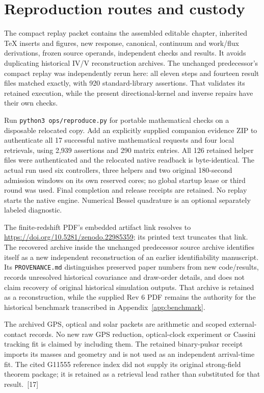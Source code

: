 \documentclass[10pt,twocolumn,letterpaper]{article}
\begin{document}
\section{Reproduction routes and custody}\label{app:reproduce}
The compact replay packet contains the assembled editable chapter, inherited TeX inserts and figures, new response, canonical, continuum and work/flux derivations, frozen source operands, independent checks and results. It avoids duplicating historical IV/V reconstruction archives. The unchanged predecessor's compact replay was independently rerun here: all eleven steps and fourteen result files matched exactly, with 920 standard-library assertions. That validates its retained execution, while the present directional-kernel and inverse repairs have their own checks.

Run \texttt{python3 ops/reproduce.py} for portable mathematical checks on a disposable relocated copy. Add an explicitly supplied companion evidence ZIP to authenticate all 17 successful native mathematical requests and four local retrievals, using 2,939 assertions and 290 matrix entries. All 126 retained helper files were authenticated and the relocated native readback is byte-identical. The actual run used six controllers, three helpers and two original 180-second admission windows on its own reserved cores; no global startup lease or third round was used. Final completion and release receipts are retained. No replay starts the native engine. Numerical Bessel quadrature is an optional separately labeled diagnostic.

The finite-redshift PDF's embedded artifact link resolves to \url{https://doi.org/10.5281/zenodo.22985359}; its printed text truncates that link. The recovered archive inside the unchanged predecessor source archive identifies itself as a new independent reconstruction of an earlier identifiability manuscript. Its \texttt{PROVENANCE.md} distinguishes preserved paper numbers from new code/results, records unresolved historical covariance and draw-order details, and does not claim recovery of original historical simulation outputs. That archive is retained as a reconstruction, while the supplied Rev 6 PDF remains the authority for the historical benchmark transcribed in Appendix~\ref{app:benchmark}.

The archived GPS, optical and solar packets are arithmetic and scoped external-contact records. No new raw GPS reduction, optical-clock experiment or Cassini tracking fit is claimed by including them. The retained binary-pulsar receipt imports its masses and geometry and is not used as an independent arrival-time fit. The cited G11555 reference index did not supply its original strong-field theorem package; it is retained as a retrieval lead rather than substituted for that result.~[17]
\end{document}
